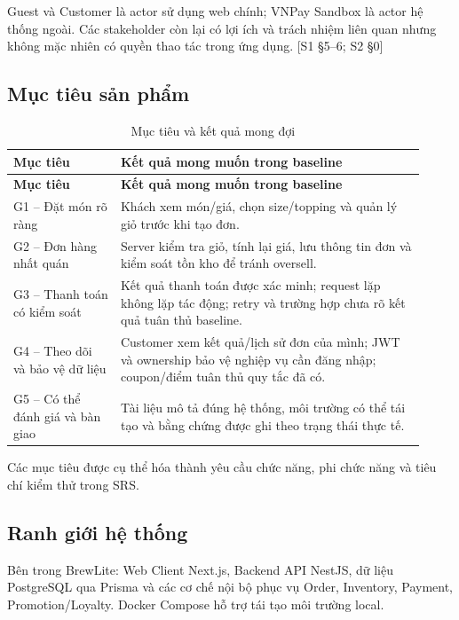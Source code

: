 Guest và Customer là actor sử dụng web chính; VNPay Sandbox là actor hệ thống ngoài. Các stakeholder còn lại có lợi ích và trách nhiệm liên quan nhưng không mặc nhiên có quyền thao tác trong ứng dụng. [S1 §5--6; S2 §0]
\par

\subsection{Mục tiêu sản phẩm}
\begingroup\small
\renewcommand{\arraystretch}{1.2}
\begin{longtable}{>{\raggedright\arraybackslash}p{0.24\linewidth}>{\raggedright\arraybackslash}p{0.68\linewidth}}
\caption{Mục tiêu và kết quả mong đợi}\label{tab:auto-context-and-scope-2}\\
\hline
\textbf{Mục tiêu} & \textbf{Kết quả mong muốn trong baseline} \\ \hline
\endfirsthead
\textbf{Mục tiêu} & \textbf{Kết quả mong muốn trong baseline} \\ \hline
\endhead
G1 -- Đặt món rõ ràng & Khách xem món/giá, chọn size/topping và quản lý giỏ trước khi tạo đơn. \\ \hline
G2 -- Đơn hàng nhất quán & Server kiểm tra giỏ, tính lại giá, lưu thông tin đơn và kiểm soát tồn kho để tránh oversell. \\ \hline
G3 -- Thanh toán có kiểm soát & Kết quả thanh toán được xác minh; request lặp không lặp tác động; retry và trường hợp chưa rõ kết quả tuân thủ baseline. \\ \hline
G4 -- Theo dõi và bảo vệ dữ liệu & Customer xem kết quả/lịch sử đơn của mình; JWT và ownership bảo vệ nghiệp vụ cần đăng nhập; coupon/điểm tuân thủ quy tắc đã có. \\ \hline
G5 -- Có thể đánh giá và bàn giao & Tài liệu mô tả đúng hệ thống, môi trường có thể tái tạo và bằng chứng được ghi theo trạng thái thực tế. \\ \hline
\end{longtable}
\endgroup

Các mục tiêu được cụ thể hóa thành yêu cầu chức năng, phi chức năng và tiêu chí kiểm thử trong SRS.
\par

\subsection{Ranh giới hệ thống}

Bên trong BrewLite: Web Client Next.js, Backend API NestJS, dữ liệu PostgreSQL qua Prisma và các cơ chế nội bộ phục vụ Order, Inventory, Payment, Promotion/Loyalty. Docker Compose hỗ trợ tái tạo môi trường local.
\par

